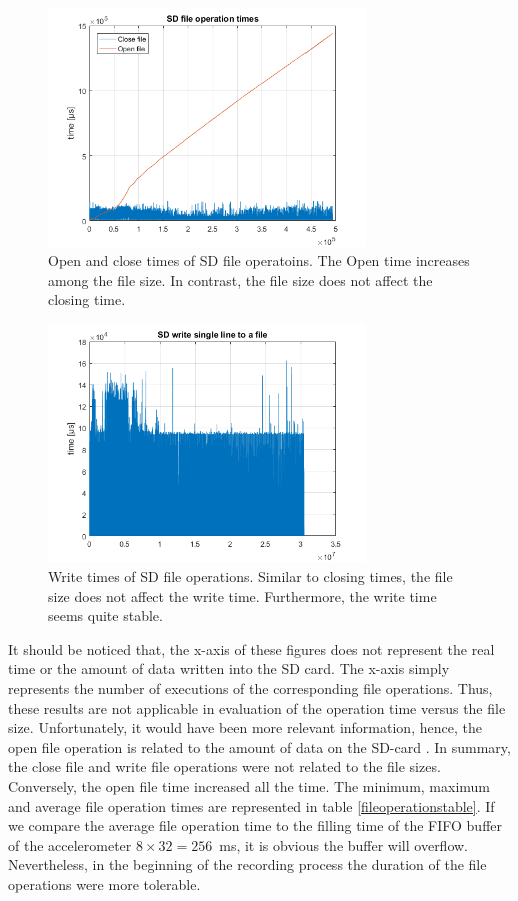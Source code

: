 \documentclass[english,12pt,a4paper,pdftex,elec,utf8]{aaltothesis}
\begin{document}
\begin{figure}[h]
\centering
\includegraphics[width = 0.75\textwidth]{figures/openclosetimes_vanha.png}
\caption{Open and close times of SD file operatoins. The Open time increases among the file size. In contrast, the file size does not affect the closing time.} \label{openclosetimes_old}
\end{figure}

\begin{figure}[h]
\centering
\includegraphics[width = 0.75\textwidth]{figures/writetimes_vanharauta.png}
\caption{Write times of SD file operations. Similar to closing times, the file size does not affect the write time. Furthermore, the write time seems quite stable.} \label{writetimes_old}
\end{figure}

It should be noticed that, the x-axis of these figures does not represent the real time or the amount of data written into the SD card. The x-axis simply represents the number of executions of the corresponding file operations. Thus, these results are not applicable in evaluation of the operation time versus the file size. Unfortunately, it would have been more relevant information, hence, the open file operation is related to the amount of data on the SD-card \cite{spimanual}. In summary, the close file and write file operations were not related to the file sizes. Conversely, the open file time increased all the time. The minimum, maximum and average file operation times are represented in table \ref{fileoperationstable}. If we compare the average file operation time to the filling time of the FIFO buffer of the accelerometer $8 \times 32=256$\SI{}{\milli\second}, it is obvious the buffer will overflow. Nevertheless, in the beginning of the recording process the duration of the file operations were more tolerable.
\end{document}

